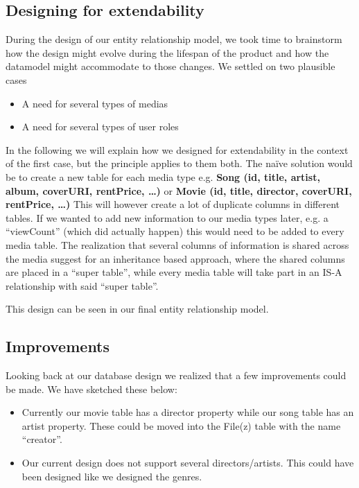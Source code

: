 \subsection{Designing for extendability}
\label{sec:extendability}
During the design of our entity relationship model, we took time to brainstorm how the design might evolve during the lifespan of the product and how the datamodel might accommodate to those changes. We settled on two plausible cases
\begin{itemize}
\item A need for several types of medias
\item A need for several types of user roles
\end{itemize}
In the following we will explain how we designed for extendability in the context of the first case, but the principle applies to them both.
The naïve solution would be to create a new table for each media type e.g. 
\textbf{Song (id, title, artist, album, coverURI, rentPrice, …)} or
\textbf{Movie (id, title, director, coverURI, rentPrice, …)}
This will however create a lot of duplicate columns in different tables. If we wanted to add new information to our media types later, e.g. a “viewCount” (which did actually happen) this would need to be added to every media table.
The realization that several columns of information is shared across the media suggest for an inheritance based approach, where the shared columns are placed in a “super table”, while every media table will take part in an IS-A relationship with said “super table”.

This design can be seen in our final entity relationship model.

\subsection{Improvements}
\label{sec:improvementsdatamodel}
Looking back at our database design we realized that a few improvements could be made. We have sketched these below:
\begin{itemize}
\item Currently our movie table has a director property while our song table has an artist property. These could be moved into the File(z) table with the name “creator”.
\item Our current design does not support several directors/artists. This could have been designed like we designed the genres.
\end{itemize}

